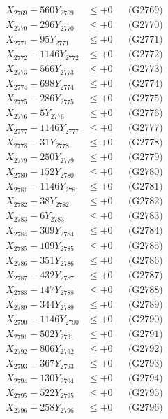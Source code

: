 \documentclass[a4paper,10pt]{article}
\begin{document}
{\begin{align}
X_{2769} - 560Y_{2769} &\leq +0 && \text{(G2769)} \\
X_{2770} - 296Y_{2770} &\leq +0 && \text{(G2770)} \\
\allowbreak
X_{2771} - 95Y_{2771} &\leq +0 && \text{(G2771)} \\
X_{2772} - 1146Y_{2772} &\leq +0 && \text{(G2772)} \\
X_{2773} - 566Y_{2773} &\leq +0 && \text{(G2773)} \\
X_{2774} - 698Y_{2774} &\leq +0 && \text{(G2774)} \\
X_{2775} - 286Y_{2775} &\leq +0 && \text{(G2775)} \\
X_{2776} - 5Y_{2776} &\leq +0 && \text{(G2776)} \\
X_{2777} - 1146Y_{2777} &\leq +0 && \text{(G2777)} \\
X_{2778} - 31Y_{2778} &\leq +0 && \text{(G2778)} \\
X_{2779} - 250Y_{2779} &\leq +0 && \text{(G2779)} \\
X_{2780} - 152Y_{2780} &\leq +0 && \text{(G2780)} \\
\allowbreak
X_{2781} - 1146Y_{2781} &\leq +0 && \text{(G2781)} \\
X_{2782} - 38Y_{2782} &\leq +0 && \text{(G2782)} \\
X_{2783} - 6Y_{2783} &\leq +0 && \text{(G2783)} \\
X_{2784} - 309Y_{2784} &\leq +0 && \text{(G2784)} \\
X_{2785} - 109Y_{2785} &\leq +0 && \text{(G2785)} \\
X_{2786} - 351Y_{2786} &\leq +0 && \text{(G2786)} \\
X_{2787} - 432Y_{2787} &\leq +0 && \text{(G2787)} \\
X_{2788} - 147Y_{2788} &\leq +0 && \text{(G2788)} \\
X_{2789} - 344Y_{2789} &\leq +0 && \text{(G2789)} \\
X_{2790} - 1146Y_{2790} &\leq +0 && \text{(G2790)} \\
\allowbreak
X_{2791} - 502Y_{2791} &\leq +0 && \text{(G2791)} \\
X_{2792} - 806Y_{2792} &\leq +0 && \text{(G2792)} \\
X_{2793} - 367Y_{2793} &\leq +0 && \text{(G2793)} \\
X_{2794} - 130Y_{2794} &\leq +0 && \text{(G2794)} \\
X_{2795} - 522Y_{2795} &\leq +0 && \text{(G2795)} \\
X_{2796} - 258Y_{2796} &\leq +0 && \text{(G2796)} \\

\end{align}}
\end{document}
